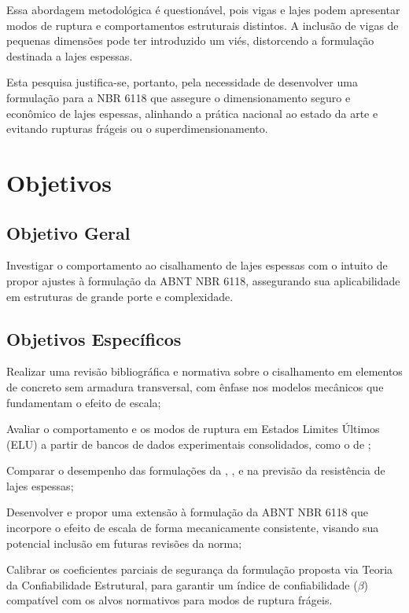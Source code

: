 \documentclass[
	12pt,				%
	openright,			%
	twoside,			%
	a4paper,			%
	chapter=TITLE,		%
	section=TITLE,		%
	subsection=TITLE,	%
	subsubsection=TITLE,%
	partnum=false,
	brazil,			%
]{abntex2}
\begin{document}
Essa abordagem metodológica é questionável, pois vigas e lajes podem apresentar modos de ruptura e comportamentos estruturais distintos. A inclusão de vigas de pequenas dimensões pode ter introduzido um viés, distorcendo a formulação destinada a lajes espessas.

Esta pesquisa justifica-se, portanto, pela necessidade de desenvolver uma formulação para a NBR 6118 que assegure o dimensionamento seguro e econômico de lajes espessas, alinhando a prática nacional ao estado da arte e evitando rupturas frágeis ou o superdimensionamento.

\chapter{Objetivos}
\section{Objetivo Geral}

Investigar o comportamento ao cisalhamento de lajes espessas com o intuito de propor ajustes à formulação da ABNT NBR 6118, assegurando sua aplicabilidade em estruturas de grande porte e complexidade.

\section{Objetivos Específicos}
\begin{alineas}
    \item Realizar uma revisão bibliográfica e normativa sobre o cisalhamento em elementos de concreto sem armadura transversal, com ênfase nos modelos mecânicos que fundamentam o efeito de escala;
    \item Avaliar o comportamento e os modos de ruptura em Estados Limites Últimos (ELU) a partir de bancos de dados experimentais consolidados, como o de \textcite{Kuchma2019};
    \item Comparar o desempenho das formulações da \textcite{NBR6118:2023}, \textcite{CEN2004}, \textcite{ACI318:2019} e \textcite{FIB:2020} na previsão da resistência de lajes espessas;
    \item Desenvolver e propor uma extensão à formulação da ABNT NBR 6118 que incorpore o efeito de escala de forma mecanicamente consistente, visando sua potencial inclusão em futuras revisões da norma;
    \item Calibrar os coeficientes parciais de segurança da formulação proposta via Teoria da Confiabilidade Estrutural, para garantir um índice de confiabilidade ($\beta$) compatível com os alvos normativos para modos de ruptura frágeis.
\end{alineas}
\end{document}
